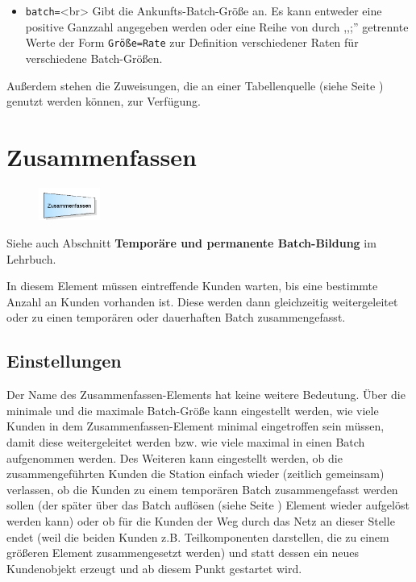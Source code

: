 \begin{itemize}
  \item \texttt{batch=}<br>
  Gibt die Ankunfts-Batch-Größe an. Es kann entweder eine positive Ganzzahl angegeben werden oder eine Reihe von
  durch ,,;'' getrennte Werte der Form \texttt{Größe=Rate} zur Definition verschiedener Raten für verschiedene Batch-Größen. 
\end{itemize}

Außerdem stehen die Zuweisungen, die an einer Tabellenquelle (siehe Seite \pageref{ref:ModelElementSourceTable}) genutzt werden können, zur Verfügung.


\section{Zusammenfassen}
\label{ref:ModelElementBatch}

\begin{figure}
\vspace{-22pt}
\includegraphics[width=2cm]{imageModelElementBatch.png}
\vspace{-22pt}
\end{figure}

Siehe auch Abschnitt \textbf{Temporäre und permanente Batch-Bildung} im Lehrbuch.

In diesem Element müssen eintreffende Kunden warten, bis eine bestimmte Anzahl an Kunden vorhanden ist.
Diese werden dann gleichzeitig weitergeleitet oder zu einen temporären oder dauerhaften Batch zusammengefasst.

\subsection*{Einstellungen}

Der Name des Zusammenfassen-Elements hat keine weitere Bedeutung. Über die minimale und die maximale Batch-Größe kann
eingestellt werden, wie viele Kunden in dem Zusammenfassen-Element minimal eingetroffen sein müssen, damit diese 
weitergeleitet werden bzw. wie viele maximal in einen Batch aufgenommen werden. Des Weiteren kann eingestellt werden,
ob die zusammengeführten Kunden die Station einfach wieder (zeitlich gemeinsam) verlassen, ob die Kunden zu einem temporären
Batch zusammengefasst werden sollen (der später über das Batch auflösen (siehe Seite \pageref{ref:ModelElementSeparate}) Element
wieder aufgelöst werden kann) oder ob für die Kunden der Weg durch
das Netz an dieser Stelle endet (weil die beiden Kunden z.B. Teilkomponenten darstellen, die zu einem größeren Element
zusammengesetzt werden) und statt dessen ein neues Kundenobjekt erzeugt und ab diesem Punkt gestartet wird.


